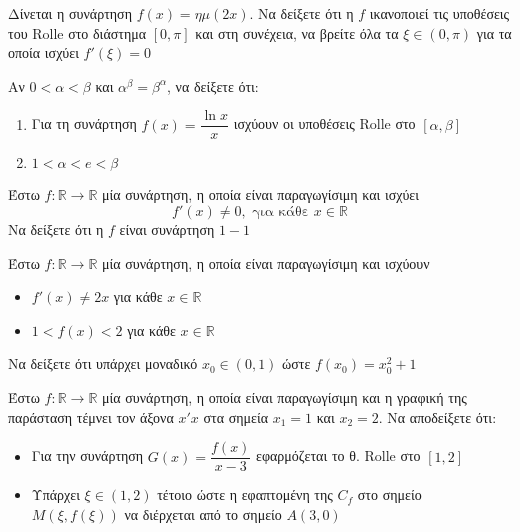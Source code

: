 \documentclass{presentation}
\begin{document}
\begin{askisi}
  Δίνεται η συνάρτηση $f(x)=ημ(2x)$. Να δείξετε ότι η $f$ ικανοποιεί τις υποθέσεις του Rolle στο διάστημα $[0,π]$ και στη συνέχεια, να βρείτε όλα τα $ξ\in (0,π)$ για τα οποία ισχύει $f'(ξ)=0$
\end{askisi}

\begin{askisi}
  Αν $0<α<β$ και $α^β=β^α$, να δείξετε ότι:
  \begin{enumerate}
    \item<1-> Για τη συνάρτηση $f(x)=\dfrac{\ln x}{x}$ ισχύουν οι υποθέσεις Rolle στο $[α,β]$
    \item<2-> $1<α<e<β$
  \end{enumerate}
\end{askisi}

\begin{askisi}
  Έστω $f:\mathbb{R}\to\mathbb{R}$ μία συνάρτηση, η οποία είναι παραγωγίσιμη και ισχύει
  $$f'(x)\ne 0, \text{ για κάθε } x\in\mathbb{R}$$
  Να δείξετε ότι η $f$ είναι συνάρτηση $1-1$
\end{askisi}

\begin{askisi}
  Έστω $f:\mathbb{R}\to\mathbb{R}$ μία συνάρτηση, η οποία είναι παραγωγίσιμη και ισχύουν
  \begin{itemize}
    \item $f'(x)\ne 2x$ για κάθε $x\in\mathbb{R}$
    \item $1<f(x)<2$ για κάθε $x\in\mathbb{R}$
  \end{itemize}
  Να δείξετε ότι υπάρχει μοναδικό $x_0\in (0,1)$ ώστε $f(x_0)=x_0^2+1$
\end{askisi}

\begin{askisi}
  Έστω $f:\mathbb{R}\to\mathbb{R}$ μία συνάρτηση, η οποία είναι παραγωγίσιμη και η γραφική της παράσταση τέμνει τον άξονα $x'x$ στα σημεία $x_1=1$ και $x_2=2$. Να αποδείξετε ότι:
  \begin{itemize}
    \item Για την συνάρτηση $G(x)=\dfrac{f(x)}{x-3}$ εφαρμόζεται το θ. Rolle στο $[1,2]$
    \item Υπάρχει $ξ\in (1,2)$ τέτοιο ώστε η εφαπτομένη της $C_f$ στο σημείο $Μ(ξ,f(ξ))$ να διέρχεται από το σημείο $Α(3,0)$
  \end{itemize}
\end{askisi}
\end{document}

